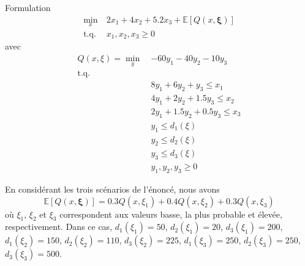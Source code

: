 \documentclass[12pt]{book}
\def\bxi {\boldsymbol{\xi}}
\def\EE {\mathbb{E}}
\begin{document}
\begin{enumerate}
Formulation
\begin{align*}
\min_x \ & 2x_1 + 4x_2 + 5.2x_3 + \EE[Q(x,\bxi) ]\\
\mbox{t.q. } & x_1, x_2, x_3 \geq 0
\end{align*}
avec
\begin{align*}
Q(x,\xi) = \min_y \ & -60y_1-40y_2-10y_3 \\
\mbox{t.q.} \\
& 8y_1 + 6y_2 + y_3 \leq x_1 \\
& 4y_1 + 2y_2 + 1.5y_3 \leq x_2 \\
& 2y_1 + 1.5y_2 + 0.5y_3 \leq x_3 \\
& y_1 \leq d_1(\xi) \\
& y_2 \leq d_2(\xi) \\
& y_3 \leq d_3(\xi) \\
& y_1, y_2, y_3 \geq 0
\end{align*}

En considérant les trois scénarios de l'énoncé, nous avons
$$
\EE[Q(x,\bxi) ] = 0.3 Q(x,\xi_1)+ 0.4 Q(x,\xi_2) + 0.3 Q(x,\xi_3)
$$
où $\xi_1$, $\xi_2$ et $\xi_3$ correspondent aux valeurs basse, la plus probable et élevée, respectivement.
Dans ce cas, $d_1(\xi_1) = 50$, $d_2(\xi_1) = 20$, $d_3(\xi_1) = 200$, $d_1(\xi_2) = 150$, $d_2(\xi_2) = 110$, $d_3(\xi_2) = 225$, $d_1(\xi_3) = 250$, $d_2(\xi_3) = 250$, $d_3(\xi_3) = 500$.
\end{enumerate}


\end{document}

